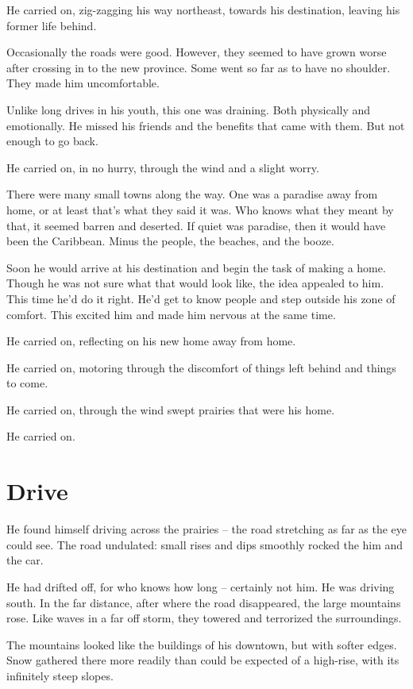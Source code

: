 \documentclass[fontsize=12pt,english]{scrreprt}
\begin{document}
He carried on, zig-zagging his way northeast, towards his destination,
leaving his former life behind.

Occasionally the roads were good. However, they seemed to have grown
worse after crossing in to the new province. Some went so far as to
have no shoulder. They made him uncomfortable.

Unlike long drives in his youth, this one was draining. Both
physically and emotionally. He missed his friends and the benefits
that came with them. But not enough to go back.

He carried on, in no hurry, through the wind and a slight worry.

There were many small towns along the way. One was a paradise away
from home, or at least that's what they said it was. Who knows what
they meant by that, it seemed barren and deserted. If quiet was
paradise, then it would have been the Caribbean. Minus the people, the
beaches, and the booze.

Soon he would arrive at his destination and begin the task of making a
home. Though he was not sure what that would look like, the idea
appealed to him. This time he'd do it right. He'd get to know people
and step outside his zone of comfort. This excited him and made him
nervous at the same time.

He carried on, reflecting on his new home away from home.

He carried on, motoring through the discomfort of things left behind
and things to come.

He carried on, through the wind swept prairies that were his home.

He carried on.

\newpage

\section{Drive}

He found himself driving across the prairies -- the road stretching as
far as the eye could see. The road undulated: small rises and dips
smoothly rocked the him and the car.

He had drifted off, for who knows how long -- certainly not him. He
was driving south. In the far distance, after where the road
disappeared, the large mountains rose. Like waves in a far off storm,
they towered and terrorized the surroundings.

The mountains looked like the buildings of his downtown, but with
softer edges. Snow gathered there more readily than could be expected
of a high-rise, with its infinitely steep slopes.
\end{document}
